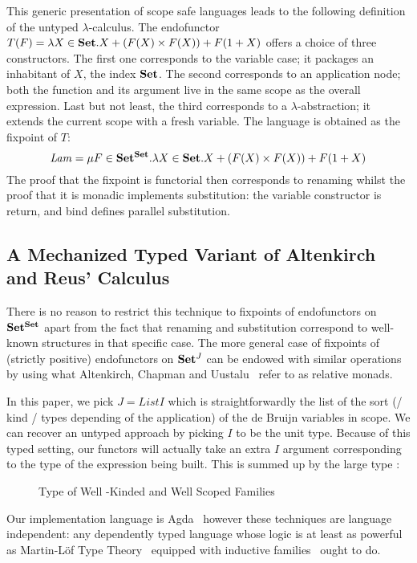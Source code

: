 This generic presentation of scope safe languages leads to the following
definition of the untyped $\lambda$-calculus. The endofunctor
$T(F) = \lambda X \in \mathbf{Set}{}. X + (F(X) \times F(X)) + F(1 + X)$
offers a choice of three constructors. The first one corresponds to the variable
case; it packages an inhabitant of $X$, the index $\mathbf{Set}{}$. The second corresponds
to an application node; both the function and its argument live in the same
scope as the overall expression. Last but not least, the third corresponds to
a $\lambda$-abstraction; it extends the current scope with a fresh variable.
The language is obtained as the fixpoint of $T$:
\[
   \mathit{Lam} = \mu F \in \mathbf{Set}{}^{\mathbf{Set}{}}.
   \lambda X \in \mathbf{Set}{}. X + (F(X) \times F(X)) + F(1 + X)
\]
The proof that the fixpoint is functorial then corresponds to renaming
whilst the proof that it is monadic implements substitution: the variable
constructor is return, and bind defines parallel substitution.

\subsection{A Mechanized Typed Variant of Altenkirch and Reus' Calculus}

There is no reason to restrict this technique to fixpoints of endofunctors
on $\mathbf{Set}{}^{\mathbf{Set}{}}$ apart from the fact that renaming and substitution
correspond to well-known structures in that specific case. The more general
case of fixpoints of (strictly positive) endofunctors on $\mathbf{Set}{}^J$ can be
endowed with similar operations by using what Altenkirch, Chapman and
Uustalu~\citeyear{Altenkirch2010, JFR4389} refer to as relative monads.

In this paper, we pick $J = \mathit{List} I$ which is straightforwardly the list
of the sort (/ kind / types depending of the application) of the de Bruijn variables
in scope. We can recover an untyped approach by picking $I$ to be the unit type.
Because of this typed setting, our functors will actually take an extra $I$ argument
corresponding to the type of the expression being built. This is summed up by
the large type :

\begin{figure}[h]
\caption{Type of Well -Kinded and Well Scoped Families}
\end{figure}

Our implementation language is Agda~\cite{norell2009dependently} however
these techniques are language independent: any dependently typed language
whose logic is at least as powerful as Martin-L\"of Type
Theory~\cite{martin1982constructive} equipped with inductive
families~\cite{dybjer1994inductive} ought to do.

